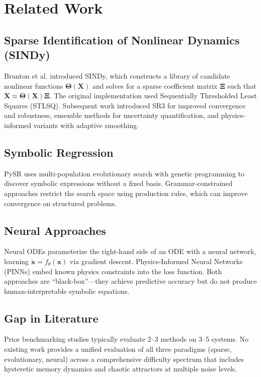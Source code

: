 \section{Related Work}
\label{sec:related}

\subsection{Sparse Identification of Nonlinear Dynamics (SINDy)}
Brunton et al. \cite{brunton2016} introduced SINDy, which constructs a library of candidate nonlinear functions $\boldsymbol{\Theta}(\mathbf{X})$ and solves for a sparse coefficient matrix $\boldsymbol{\Xi}$ such that $\dot{\mathbf{X}} \approx \boldsymbol{\Theta}(\mathbf{X})\boldsymbol{\Xi}$. The original implementation used Sequentially Thresholded Least Squares (STLSQ). Subsequent work introduced SR3 \cite{zheng2019} for improved convergence and robustness, ensemble methods for uncertainty quantification, and physics-informed variants with adaptive smoothing.

\subsection{Symbolic Regression}
PySR \cite{cranmer2023} uses multi-population evolutionary search with genetic programming to discover symbolic expressions without a fixed basis. Grammar-constrained approaches restrict the search space using production rules, which can improve convergence on structured problems.

\subsection{Neural Approaches}
Neural ODEs \cite{chen2018} parameterize the right-hand side of an ODE with a neural network, learning $\dot{\mathbf{x}} = f_\theta(\mathbf{x})$ via gradient descent. Physics-Informed Neural Networks (PINNs) \cite{raissi2019} embed known physics constraints into the loss function. Both approaches are ``black-box''---they achieve predictive accuracy but do not produce human-interpretable symbolic equations.

\subsection{Gap in Literature}
Prior benchmarking studies typically evaluate 2--3 methods on 3--5 systems. No existing work provides a unified evaluation of all three paradigms (sparse, evolutionary, neural) across a comprehensive difficulty spectrum that includes hysteretic memory dynamics and chaotic attractors at multiple noise levels.
